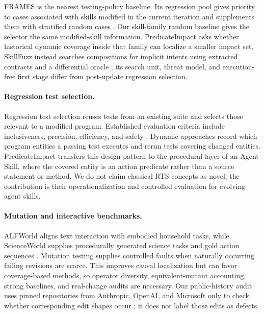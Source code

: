 \documentclass[10pt]{article}
\begin{document}
FRAMES is the nearest testing-policy baseline. Its regression pool gives priority to cases associated with skills modified in the current iteration and supplements them with stratified random cases \citep{wang2026frames}. Our skill-family random baseline gives the selector the same modified-skill information. PredicateImpact asks whether historical dynamic coverage inside that family can localize a smaller impact set. SkillFuzz instead searches compositions for implicit intents using extracted contracts and a differential oracle \citep{hu2026skillfuzz}; its search unit, threat model, and execution-free first stage differ from post-update regression selection.

\paragraph{Regression test selection.}
Regression test selection reuses tests from an existing suite and selects those relevant to a modified program. Established evaluation criteria include inclusiveness, precision, efficiency, and safety \citep{rothermel1996rts}. Dynamic approaches record which program entities a passing test executes and rerun tests covering changed entities. PredicateImpact transfers this design pattern to the procedural layer of an Agent Skill, where the covered entity is an action predicate rather than a source statement or method. We do not claim classical RTS concepts as novel; the contribution is their operationalization and controlled evaluation for evolving agent skills.

\paragraph{Mutation and interactive benchmarks.}
ALFWorld aligns text interaction with embodied household tasks, while ScienceWorld supplies procedurally generated science tasks and gold action sequences \citep{shridhar2021alfworld,wang2022scienceworld}. Mutation testing supplies controlled faults when naturally occurring failing revisions are scarce. This improves causal localization but can favor coverage-based methods, so operator diversity, equivalent-mutant accounting, strong baselines, and real-change audits are necessary. Our public-history audit uses pinned repositories from Anthropic, OpenAI, and Microsoft only to check whether corresponding edit shapes occur \citep{anthropicskills2026,openaiskills2026,microsoftskills2026}; it does not label those edits as defects.
\end{document}
